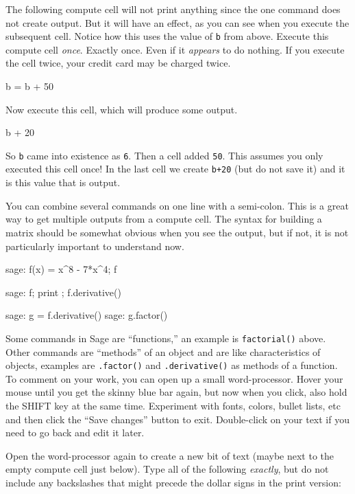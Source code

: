 %
The following compute cell will not print anything since the one command does not create output.  But it will have an effect, as you can see when you execute the subsequent cell.  Notice how this uses the value of \verb?b? from above.  Execute this compute cell \emph{once}.  Exactly once.  Even if it \emph{appears} to do nothing.  If you execute the cell twice, your credit card may be charged twice.
%
\begin{sageverbatim}
b = b + 50
\end{sageverbatim}
%
Now execute this cell, which will produce some output.
%
\begin{sageverbatim}
b + 20
\end{sageverbatim}
%
So \verb?b? came into existence as \verb?6?.  Then a cell added \verb?50?.  This assumes you only executed this cell once!  In the last cell we create \verb?b+20? (but do not save it) and it is this value that is output.\par
%
You can combine several commands on one line with a semi-colon.  This is a great way to get multiple outputs from a compute cell.  The syntax for building a matrix should be somewhat obvious when you see the output, but if not, it is not particularly important to understand now.
%
\begin{sageverbatim}
sage: f(x) = x^8 - 7*x^4; f
\end{sageverbatim}
%
\begin{sageverbatim}
sage: f; print ; f.derivative()
\end{sageverbatim}
%
\begin{sageverbatim}
sage: g = f.derivative()
sage: g.factor()
\end{sageverbatim}
%
Some commands in Sage are ``functions,'' an example is \verb?factorial()? above.  Other commands are ``methods'' of an object and are like characteristics of objects, examples are \verb?.factor()? and \verb?.derivative()? as methods of a function.
%
To comment on your work, you can open up a small word-processor.  Hover your mouse until you get the skinny blue bar again, but now when you click, also hold the SHIFT key at the same time.  Experiment with fonts, colors, bullet lists, etc and then click the ``Save changes'' button to exit.  Double-click on your text if you need to go back and edit it later.\par
%
Open the word-processor again to create a new bit of text (maybe next to the empty compute cell just below).  Type all of the following \emph{exactly}, but do not include any backslashes that might precede the dollar signs in the print version:
